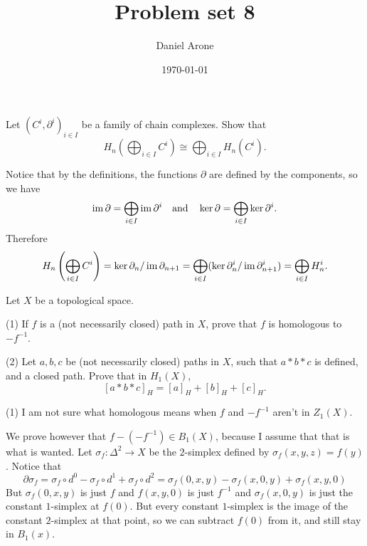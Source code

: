 \documentclass{article}
\title{Problem set 8}
\author{Daniel Arone}
\date{\today}
\begin{document}
\maketitle

\setcounter{section}{8}

\begin{exerciseseries}
	\exercise Let $(C^i,\partial^i)_{i\in I}$ be a family of chain complexes.
	Show that
	\[H_n\left(\bigoplus_{i\in I}C^i\right)\cong\bigoplus_{i\in I}H_n(C^i).\]
	\begin{solution*}
		Notice that by the definitions, the functions $\partial$ are defined by the components, so we have
		\[\operatorname{im}\partial=\bigoplus_{i\in I}\operatorname{im}\partial^i\quad\text{and}\quad\ker\partial=\bigoplus_{i\in I}\ker\partial^i.\]
		Therefore
		\[H_n\left(\bigoplus_{i\in I}C^i\right)=\ker\partial_n/\operatorname{im}\partial_{n+1}=\bigoplus_{i\in I}(\ker\partial_n^i/\operatorname{im}\partial_{n+1}^i)=\bigoplus_{i\in I} H_n^i.\]
	\end{solution*}
	\exercise Let $X$ be a topological space.

	(1) If $f$ is a (not necessarily closed) path in $X$, prove that $f$ is homologous to $-f^{-1}$.

	(2) Let $a,b,c$ be (not necessarily closed) paths in $X$, such that $a*b*c$ is defined, and a closed path.
	Prove that in $H_1(X)$,
	\[[a*b*c]_H=[a]_H+[b]_H+[c]_H.\]
	\begin{solution*}

		(1) I am not sure what homologous means when $f$ and $-f^{-1}$ aren't in $Z_1(X)$.

		We prove however that $f-(-f^{-1})\in B_1(X)$, because I assume that that is what is wanted.
		Let $\sigma_f:\Delta^2\to X$ be the $2$-simplex defined by $\sigma_f(x,y,z)=f(y)$.
		Notice that
		\[\partial\sigma_f=\sigma_f\circ d^0-\sigma_f\circ d^1+\sigma_f\circ d^2=\sigma_f(0,x,y)-\sigma_f(x,0,y)+\sigma_f(x,y,0)\]
		But $\sigma_f(0,x,y)$ is just $f$ and $f(x,y,0)$ is just $f^{-1}$ and $\sigma_f(x,0,y)$ is just the constant $1$-simplex at $f(0)$.
		But every constant $1$-simplex is the image of the constant $2$-simplex at that point, so we can subtract $f(0)$ from it, and still stay in $B_1(x)$.


\end{solution*}
\end{exerciseseries}
\end{document}
